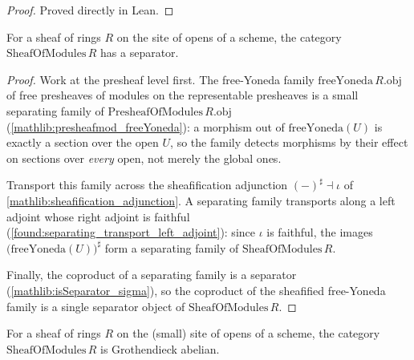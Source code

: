\begin{proof}

\leanok
  Proved directly in Lean.
\end{proof}

\begin{lemma}
  \label{found:sheafmod_separator}
  For a sheaf of rings \(R\) on the site of opens of a scheme, the category
  \(\mathrm{SheafOfModules}\,R\) has a separator.
\end{lemma}

\begin{proof}
  \leanok
  Work at the presheaf level first.  The free-Yoneda family
  \(\mathrm{freeYoneda}\,R.\mathrm{obj}\) of free presheaves of modules on the
  representable presheaves is a small separating family of
  \(\mathrm{PresheafOfModules}\,R.\mathrm{obj}\)
  (\cref{mathlib:presheafmod_freeYoneda}): a morphism out of
  \(\mathrm{freeYoneda}(U)\) is exactly a section over the open \(U\), so the
  family detects morphisms by their effect on sections over \emph{every} open, not
  merely the global ones.

  Transport this family across the sheafification adjunction
  \((-)^{\sharp}\dashv\iota\) of \cref{mathlib:sheafification_adjunction}.  A separating family transports
  along a left adjoint whose right adjoint is faithful
  (\cref{found:separating_transport_left_adjoint}): since \(\iota\) is faithful,
  the images \(\bigl(\mathrm{freeYoneda}(U)\bigr)^{\sharp}\) form a separating
  family of \(\mathrm{SheafOfModules}\,R\).

  Finally, the coproduct of a separating family is a separator
  (\cref{mathlib:isSeparator_sigma}), so the coproduct of the sheafified
  free-Yoneda family is a single separator object of
  \(\mathrm{SheafOfModules}\,R\).
\end{proof}

\begin{lemma}

  \label{found:sheafmod_grothendieck_abelian}
  For a sheaf of rings \(R\) on the (small) site of opens of a scheme, the category
  \(\mathrm{SheafOfModules}\,R\) is Grothendieck abelian.
\end{lemma}

